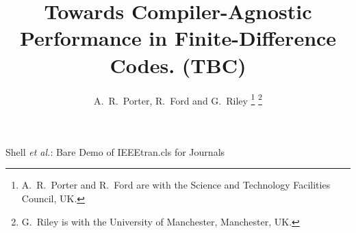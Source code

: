 \documentclass[journal]{IEEEtran}
\begin{document}
%
\title{Towards Compiler-Agnostic Performance in Finite-Difference Codes. (TBC)}
%
%

\author{A.~R.~Porter, R.~Ford and G.~Riley%
\thanks{A.~R.~Porter and R.~Ford are with the Science and Technology Facilities Council, UK.}%
\thanks{G.~Riley is with the University of Manchester, Manchester, UK.}%
}

% 
%


%
{Shell \MakeLowercase{\textit{et al.}}: Bare Demo of IEEEtran.cls for Journals}
% 




\end{document}

